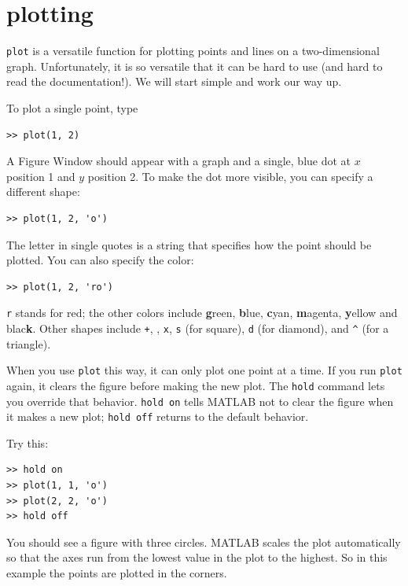\documentclass{book}
\begin{document}
\section{plotting}
\label{plotting}

{\tt plot} is a versatile function for plotting points and lines
on a two-dimensional graph.  Unfortunately, it is so versatile
that it can be hard to use (and hard to read the documentation!).
We will start simple and work our way up.

To plot a single point, type

\begin{verbatim}
>> plot(1, 2)
\end{verbatim}

A {\sf Figure Window} should appear with a graph and a single, blue dot
at $x$ position 1 and $y$ position 2.  To make the dot more visible,
you can specify a different shape:

\begin{verbatim}
>> plot(1, 2, 'o')
\end{verbatim}

The letter in single quotes is a string that specifies how the
point should be plotted.  You can also specify the color:

\begin{verbatim}
>> plot(1, 2, 'ro')
\end{verbatim}

{\tt r} stands for red; the other colors include {\bf g}reen, {\bf
b}lue, {\bf c}yan, {\bf m}agenta, {\bf y}ellow and blac{\bf k}.
Other shapes include {\tt +},
{\tt *},
{\tt x},
{\tt s} (for square),
{\tt d} (for diamond), and
\verb+^+ (for a triangle).

When you use {\tt plot} this way, it can only plot one point at a
time.  If you run {\tt plot} again, it clears the figure before making
the new plot.  The {\tt hold} command lets you override that behavior.
{\tt hold on} tells MATLAB not to clear the figure when it makes a new
plot; {\tt hold off} returns to the default behavior.

Try this:

\begin{verbatim}
>> hold on
>> plot(1, 1, 'o')
>> plot(2, 2, 'o')
>> hold off
\end{verbatim}

You should see a figure with three circles.  MATLAB scales
the plot automatically so that the axes run from the lowest value in
the plot to the highest.  So in this example the points are plotted in
the corners.
\end{document}
